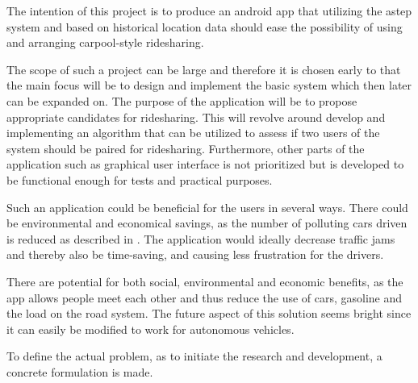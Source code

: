 The intention of this project is to produce an android app that utilizing the \gls{astep} system and based on historical location data should ease the possibility of using and arranging carpool-style ridesharing.

The scope of such a project can be large and therefore it is chosen early to that the main focus will be to design and implement the basic system which then later can be expanded on.
The purpose of the application will be to propose appropriate candidates for ridesharing.
This will revolve around develop and implementing an algorithm that can be utilized to assess if two users of the system should be paired for ridesharing.
Furthermore, other parts of the application such as graphical user interface is not prioritized but is developed to be functional enough for tests and practical purposes.

Such an application could be beneficial for the users in several ways.
There could be environmental and economical  savings, as the number of polluting cars driven is reduced as described in \cite{doi:10.1080/01441647.2011.621557}. 
The application would ideally decrease traffic jams and thereby also be time-saving, and causing less frustration for the drivers.

There are potential for both social, environmental and economic benefits, as the app allows people meet each other and thus reduce the use of cars, gasoline and the load on the road system.
The future aspect of this solution seems bright since it can easily be modified to work for autonomous vehicles.

To define the actual problem, as to initiate the research and development, a concrete formulation is made.